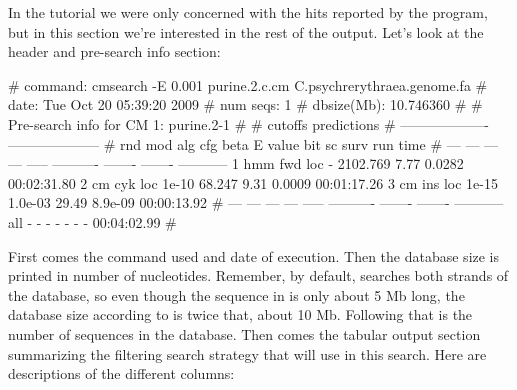 
In the tutorial we were only concerned with the hits reported by the
program, but in this section we're interested in the rest of the
output. Let's look at the header and pre-search info section:

\newpage

\begin{sreoutput}
# command:    cmsearch -E 0.001 purine.2.c.cm C.psychrerythraea.genome.fa
# date:       Tue Oct 20 05:39:20 2009
# num seqs:   1
# dbsize(Mb): 10.746360
#
# Pre-search info for CM 1: purine.2-1
#
#                                  cutoffs            predictions     
#                            -------------------  --------------------
# rnd  mod  alg  cfg   beta     E value   bit sc     surv     run time
# ---  ---  ---  ---  -----  ----------  -------  -------  -----------
    1  hmm  fwd  loc      -    2102.769     7.77   0.0282  00:02:31.80
    2   cm  cyk  loc  1e-10      68.247     9.31   0.0009  00:01:17.26
    3   cm  ins  loc  1e-15     1.0e-03    29.49  8.9e-09  00:00:13.92
# ---  ---  ---  ---  -----  ----------  -------  -------  -----------
  all    -    -    -      -           -        -        -  00:04:02.99
#
\end{sreoutput}

First comes the command used and date of execution. Then the database
size is printed in number of nucleotides. Remember, by default,
 searches both strands of the database, so even though
the sequence in  is only about 5 Mb
long, the database size according to  is twice that,
about 10 Mb. Following that is the number of sequences in the
database. Then comes the tabular output section summarizing the
filtering search strategy that  will use in this
search. Here are descriptions of the different columns:

